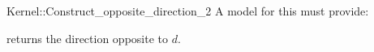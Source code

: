 \begin{ccRefFunctionObjectConcept}{Kernel::Construct_opposite_direction_2}
A model for this must provide:


 {returns the direction opposite to $d$.}

\ccIsModel{}

\end{ccRefFunctionObjectConcept}
